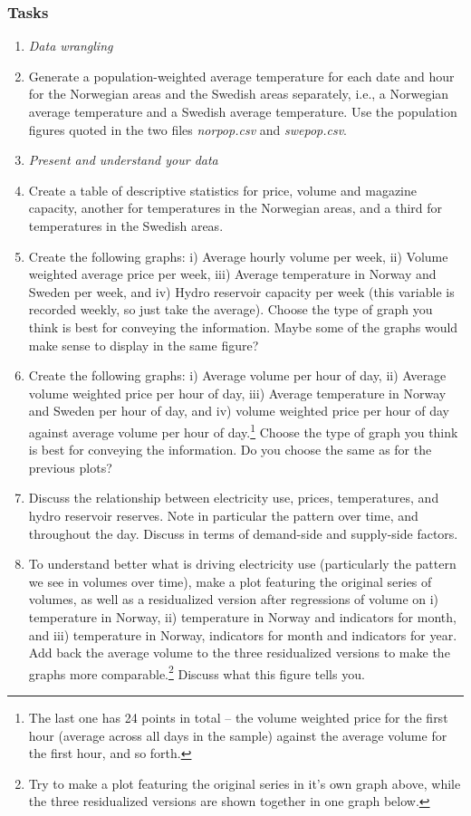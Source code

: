 \documentclass[12pt,a4paper]{article}
\begin{document}
\subsubsection*{Tasks}
\begin{enumerate}
 \item[] \emph{Data wrangling}
 \item Generate a population-weighted average temperature for each date and hour for the Norwegian areas and the Swedish areas separately, i.e., a Norwegian average temperature and a Swedish average temperature. Use the population figures quoted in the two files \emph{norpop.csv} and \emph{swepop.csv}.
 \item[] \emph{Present and understand your data}
\item Create a table of descriptive statistics for price, volume and magazine capacity, another for temperatures in the Norwegian areas, and a third for temperatures in the Swedish areas.
\item Create the following graphs: i) Average hourly volume per week, ii) Volume weighted average price per week, iii) Average temperature in Norway and Sweden per week, and iv) Hydro reservoir capacity per week (this variable is recorded weekly, so just take the average). Choose the type of graph you think is best for conveying the information. Maybe some of the graphs would make sense to display in the same figure?
\item Create the following graphs: i) Average volume per hour of day, ii) Average volume weighted price per hour of day, iii) Average temperature in Norway and Sweden per hour of day, and iv) volume weighted price per hour of day against average volume per hour of day.\footnote{The last one has 24 points in total -- the volume weighted price for the first hour (average across all days in the sample) against the average volume for the first hour, and so forth.} Choose the type of graph you think is best for conveying the information. Do you choose the same as for the previous plots?
\item Discuss the relationship between electricity use, prices, temperatures, and hydro reservoir reserves. Note in particular the pattern over time, and throughout the day. Discuss in terms of demand-side and supply-side factors.
\item To understand better what is driving electricity use (particularly the pattern we see in volumes over time), make a plot featuring the original series of volumes, as well as a residualized version after regressions of volume on i) temperature in Norway, ii) temperature in Norway and indicators for month, and iii) temperature in Norway, indicators for month and indicators for year. Add back the average volume to the three residualized versions to make the graphs more comparable.\footnote{Try to make a plot featuring the original series in it's own graph above, while the three residualized versions are shown together in one graph below.} Discuss what this figure tells you.

\end{enumerate}
\end{document}
